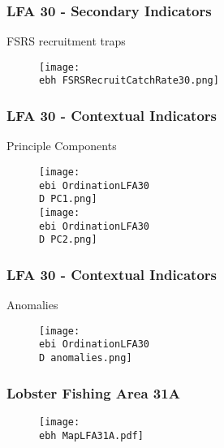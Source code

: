 \documentclass{beamer}
\newcommand{\ebh}{\string~/bio.data/bio.lobster/figures/Assessment/LFA2732/} %
\newcommand{\ebi}{\string~/bio.data/bio.lobster/figures/Assessment/Indicators/} %
\newcommand{\D}{.}
\begin{document}
\begin{frame}
\frametitle{LFA 30 - Secondary Indicators}
FSRS recruitment traps
\begin{figure}
        \begin{center}
            \texttt{[image: \\ebh FSRSRecruitCatchRate30.png]}
        \end{center}
    \end{figure}
\end{frame}



\begin{frame}
\frametitle{LFA 30 - Contextual Indicators}
Principle Components
\begin{figure}
        \begin{center}
            \texttt{[image: \\ebi OrdinationLFA30\\D PC1.png]}\\
            \texttt{[image: \\ebi OrdinationLFA30\\D PC2.png]}
        \end{center}
    \end{figure}
\end{frame}



\begin{frame}
\frametitle{LFA 30 - Contextual Indicators}
Anomalies
\begin{figure}
        \begin{center}
            \texttt{[image: \\ebi OrdinationLFA30\\D anomalies.png]}
        \end{center}
    \end{figure}
\end{frame}







\begin{frame}
\frametitle{Lobster Fishing Area 31A}
\begin{figure}
        \begin{center}
            \texttt{[image: \\ebh MapLFA31A.pdf]}
        \end{center}
    \end{figure}
\end{frame}
\end{document}
